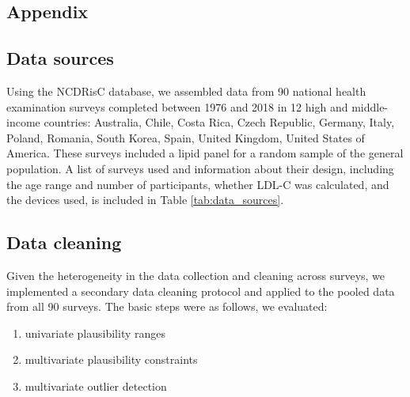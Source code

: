 \documentclass[12pt]{article}
\begin{document}
\begin{appendix}
    \renewcommand{\thefigure}{A\arabic{figure}}
    \setcounter{figure}{0}
    
    \renewcommand{\thetable}{A\arabic{table}}
    \setcounter{table}{0}
    
    \newpage
    
    \section{Appendix} \label{sec:appendixa}
    \renewcommand{\thesection}{\Alph{section}}

    \subsection{Data sources}
    Using the NCDRisC database, we assembled data from 90 national health examination surveys completed between 1976 and 2018 in 12 high and middle-income countries: Australia, Chile, Costa Rica, Czech Republic, Germany, Italy, Poland, Romania, South Korea, Spain, United Kingdom, United States of America. These surveys included a lipid panel for a random sample of the general population. A list of surveys used and information about their design, including the age range and number of participants, whether LDL-C was calculated, and the devices used, is included in Table \ref{tab:data_sources}.
    
    \begin{landscape}
    \begin{singlespace}
        
        \label{tab:data_sources}
    \end{singlespace}
    \end{landscape}

    \subsection{Data cleaning}
    Given the heterogeneity in the data collection and cleaning across surveys, we implemented a secondary data cleaning protocol and applied to the pooled data from all 90 surveys. The basic steps were as follows, we evaluated:
    \begin{enumerate}
        \item univariate plausibility ranges
        \item multivariate plausibility constraints
        \item multivariate outlier detection
    \end{enumerate}


\end{appendix}
\end{document}
